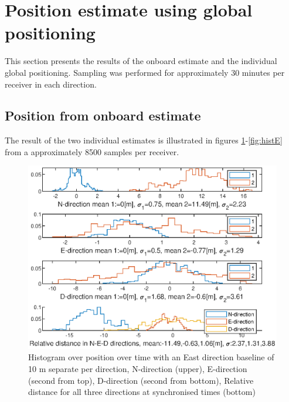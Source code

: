 \section{Position estimate using global positioning}
This section presents the results of the onboard estimate and the individual global positioning. Sampling was performed for approximately 30 minutes per receiver in each direction.
\subsection{Position from onboard estimate} \label{onBoardSolution}
The result of the two individual estimates is illustrated in figures \ref{fig:histN}-\ref{fig:histE} from a approximately 8500 samples per receiver.
\begin{figure}
\centering
\includegraphics[width=\textwidth]{Results/GPShist10mN.eps}
\caption{\label{fig:histN} Histogram over position over time with an East direction baseline of 10 m separate per direction, N-direction (upper), E-direction (second from top), D-direction (second from bottom), Relative distance for all three directions at synchronised times (bottom)}
\end{figure}
